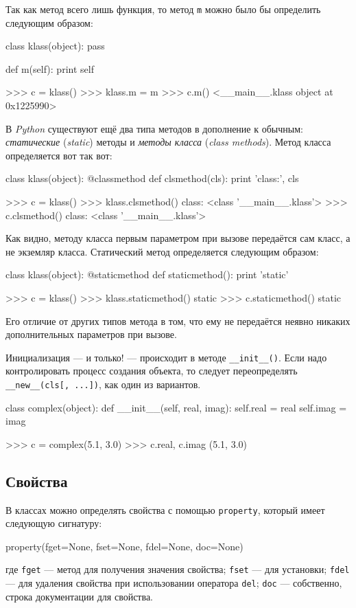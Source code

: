 Так как метод всего лишь функция, то метод \lstinline{m} можно было бы определить следующим образом:
\begin{pylst}{}{}
class klass(object):
    pass

def m(self):
    print self

>>> c = klass()
>>> klass.m = m
>>> c.m()
<__main__.klass object at 0x1225990>
\end{pylst}

В \emph{Python} существуют ещё два типа методов в дополнение к обычным: \emph{статические} (\emph{static}) методы и \emph{методы класса} (\emph{class methods}). Метод класса определяется вот так вот:
\begin{pylst}{}{}
class klass(object):
    @classmethod
    def clsmethod(cls):
        print 'class:', cls

>>> c = klass()
>>> klass.clsmethod()
class: <class '__main__.klass'>
>>> c.clsmethod()
class: <class '__main__.klass'>
\end{pylst}

Как видно, методу класса первым параметром при вызове передаётся сам класс, а не экземляр класса. Статический метод определяется следующим образом:
\begin{pylst}{}{}
class klass(object):
    @staticmethod
    def staticmethod():
        print 'static'

>>> c = klass()
>>> klass.staticmethod()
static
>>> c.staticmethod()
static
\end{pylst}

Его отличие от других типов метода в том, что ему не передаётся неявно никаких дополнительных параметров при вызове.

Инициализация — и только! — происходит в методе \lstinline{__init__()}. Если надо контролировать процесс создания объекта, то следует переопределять \lstinline{__new__(cls[, ...])}, как один из вариантов.
\begin{pylst}{}{}
class complex(object):
    def __init__(self, real, imag):
        self.real = real
        self.imag = imag

>>> c = complex(5.1, 3.0)
>>> c.real, c.imag
(5.1, 3.0)
\end{pylst}

\subsection{Свойства}

В классах можно определять свойства с помощью \lstinline{property}, который имеет следующую сигнатуру:
\begin{pylst}{}{}
property(fget=None, fset=None, fdel=None, doc=None)
\end{pylst}
где \lstinline{fget} — метод для получения значения свойства; \lstinline{fset} — для установки; \lstinline{fdel} — для удаления свойства при использовании оператора \lstinline{del}; \lstinline{doc} — собственно, строка документации для свойства.

